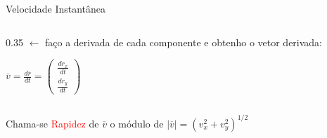 \documentclass{beamer}
\begin{document}
\begin{frame}{Velocidade Instantânea}
\begin{columns}[T]
			\begin{column}{0.35\textwidth}
				\scriptsize $\leftarrow$ faço a derivada de cada componente e obtenho o vetor derivada:
				
				\vspace{0.3cm}
				$\displaystyle \overline{v} = \frac{d\overline{r}}{dt} = \begin{pmatrix} \frac{dr_x}{dt} \\[6pt] \frac{dr_y}{dt} \end{pmatrix}$
			\end{column}
		\end{columns}
		
		\vspace{0.1cm}
		\normalsize
		Chama-se \textcolor{red}{Rapidez} de $\overline{v}$ o módulo de $|\overline{v}| = (v_x^2 + v_y^2)^{1/2}$
	\end{frame}
	
\end{document}
